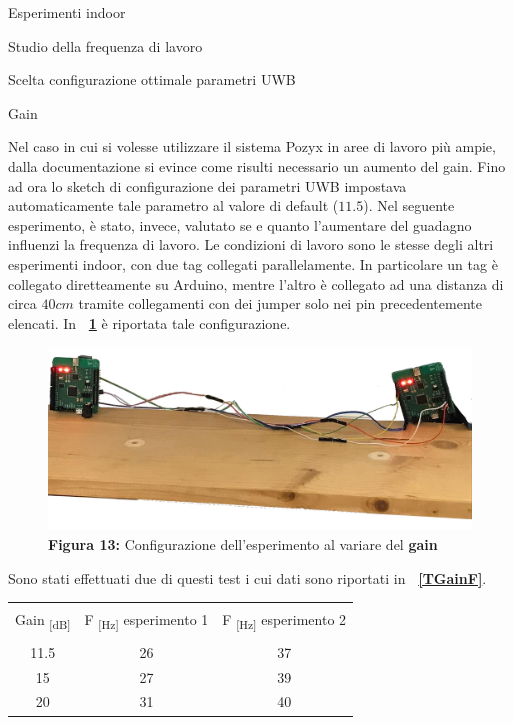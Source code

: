 \documentclass[12pt]{report}
\begin{document}
\begin{section}{Esperimenti indoor}
\begin{subsection}{Studio della frequenza di lavoro}
\begin{subsubsection}{Scelta configurazione ottimale parametri UWB}
		\end{subsubsection}
		
		\begin{subsubsection}{Gain}

			Nel caso in cui si volesse utilizzare il sistema Pozyx in aree di lavoro più ampie, dalla documentazione si evince come risulti necessario un aumento del gain. Fino ad ora lo sketch di configurazione dei parametri UWB impostava automaticamente tale parametro al valore di default ($11.5$). Nel seguente 								esperimento, è stato, invece, valutato se e quanto l’aumentare del guadagno influenzi la frequenza di lavoro. Le condizioni di lavoro sono le stesse degli altri esperimenti indoor, con due tag collegati parallelamente. In particolare un tag è collegato diretteamente su Arduino, mentre l'altro è collegato ad una 						distanza di circa $40cm$ tramite collegamenti con dei jumper solo nei pin precedentemente elencati. In \textbf{\figurename~\ref{EspGain}} è riportata tale configurazione. 
			\begin{figure}[h]
				\centering
				\includegraphics[scale=0.25]{EspGain}
	 			\caption{\textbf{Figura 13:} Configurazione dell'esperimento al variare del \textbf{gain}\label{EspGain}}
			\end{figure}
			Sono stati effettuati due di questi test i cui dati sono riportati in \textbf{\tablename~\ref{TGainF}}. 
			\begin{table}[h]
				\centering
				\footnotesize
				\begin{tabular}{|c|c|c|}
					\hline
					& &\\
					Gain\textsubscript{ [dB]}&	F\textsubscript{ [Hz]} esperimento 1 & F\textsubscript{ [Hz]} esperimento 2\\
					& &\\
					\hline
					11.5&			26&		37\\ 
					\hline
					15&				27&		39\\ 
					\hline
					20&				31&		40\\ 

\end{tabular}
\end{table}
\end{subsubsection}
\end{subsection}
\end{section}
\end{document}
